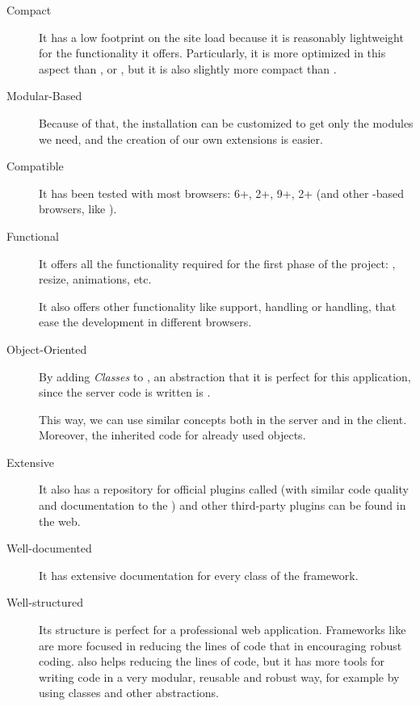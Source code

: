 \begin{description}

  \item[Compact] It has a low footprint on the site load because it is reasonably lightweight for the functionality it offers.
  Particularly, it is more optimized in this aspect than ,  or , but it is also slightly more compact than .

  \item[Modular-Based] Because of that, the installation can be customized to get only the modules we need, and the creation of our own extensions is easier.

  \item[Compatible] It has been tested with most browsers:  6+,  2+,  9+,  2+ (and other -based browsers, like ).

  \item[Functional] It offers all the functionality required for the first phase of the project: , resize, animations, etc.

It also offers other functionality like  support,  handling or  handling, that ease the development in different browsers.

  \item[Object-Oriented] By adding \emph{Classes} to , an abstraction that it is perfect for this application, since the server code is written is .

This way, we can use similar concepts both in the server and in the client. Moreover, the inherited code for  already used  objects.

  \item[Extensive] It also has a repository for official plugins called   (with similar code quality and documentation to the ) and other third-party plugins can be found in the web.

  \item[Well-documented] It has extensive documentation for every class of the  framework.

  \item[Well-structured] Its structure is perfect for a professional web application.
  Frameworks like  are more focused in reducing the  lines of code that in encouraging robust coding.
   also helps reducing the lines of code, but it has more tools for writing code in a very modular, reusable and robust way, for example by using classes and other abstractions.


\end{description}
